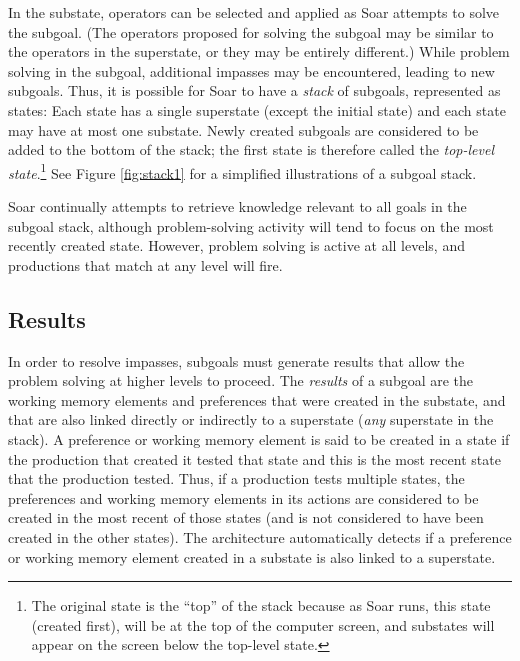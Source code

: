 In the substate, operators can be selected and applied as Soar attempts to
solve the subgoal. (The operators proposed for solving the subgoal may be
similar to the operators in the superstate, or they may be entirely
different.) While problem solving in the subgoal, additional impasses may be
encountered, leading to new subgoals.  Thus, it is possible for Soar to have a
\emph{stack} of subgoals, represented as states: Each state has 
a single superstate (except the initial state) and each state may have at most 
one substate. Newly created
subgoals are considered to be added to the bottom of the stack; the first
state is therefore called the \emph{top-level state}.\footnote{The
original state is the ``top'' of the stack because as Soar
runs, this state (created first), will be at the top of the computer screen,
and substates will appear on the screen below the top-level state.}  See
Figure \ref{fig:stack1} for a simplified illustrations of a subgoal stack.

Soar continually attempts to retrieve knowledge relevant to all goals in the
subgoal stack, although problem-solving activity will tend to focus on the
most recently created state. However, problem solving is active at
all levels, and productions that match at any level will fire.

\subsection{Results}
\label{ARCH-impasses-results}

In order to resolve impasses, subgoals must generate results that allow
the problem solving at higher levels to proceed.  The {\em results} of a
subgoal are the working memory elements and preferences that were
created in the substate, and that are also linked directly or indirectly
to a superstate (\emph{any} superstate in the stack). A preference or
working memory element is said to be created in a state if the
production that created it tested that state and this is the most recent
state that the production tested. Thus, if a production tests multiple
states, the preferences and working memory elements in its actions are
considered to be created in the most recent of those states (and is not
considered to have been created in the other states). The architecture
automatically detects if a preference or working memory element created
in a substate is also linked to a superstate.

